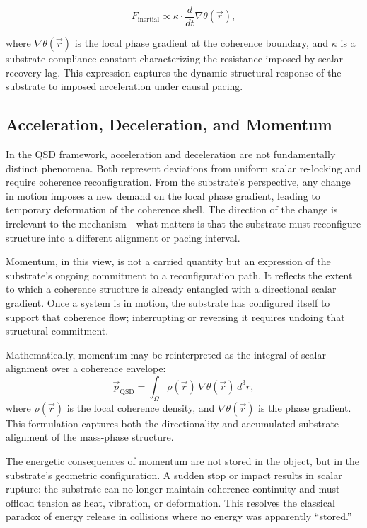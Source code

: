 \documentclass[entropy,article,submit,pdftex,moreauthors]{Definitions/mdpi}
\begin{document}
\begin{equation}
    F_{\text{inertial}} \propto \kappa \cdot \frac{d}{dt} \nabla \theta(\vec{r}),
\end{equation}

where \( \nabla \theta(\vec{r}) \) is the local phase gradient at the coherence boundary, and \( \kappa \) is a substrate compliance constant characterizing the resistance imposed by scalar recovery lag. This expression captures the dynamic structural response of the substrate to imposed acceleration under causal pacing.



\subsection{Acceleration, Deceleration, and Momentum}

In the QSD framework, acceleration and deceleration are not fundamentally distinct phenomena. Both represent deviations from uniform scalar re-locking and require coherence reconfiguration. From the substrate's perspective, any change in motion imposes a new demand on the local phase gradient, leading to temporary deformation of the coherence shell. The direction of the change is irrelevant to the mechanism—what matters is that the substrate must reconfigure structure into a different alignment or pacing interval.

Momentum, in this view, is not a carried quantity but an expression of the substrate’s ongoing commitment to a reconfiguration path. It reflects the extent to which a coherence structure is already entangled with a directional scalar gradient. Once a system is in motion, the substrate has configured itself to support that coherence flow; interrupting or reversing it requires undoing that structural commitment.

Mathematically, momentum may be reinterpreted as the integral of scalar alignment over a coherence envelope:
\[
\vec{p}_{\text{QSD}} = \int_{\Omega} \rho(\vec{r}) \, \nabla \theta(\vec{r}) \, d^3r,
\]
where \( \rho(\vec{r}) \) is the local coherence density, and \( \nabla \theta(\vec{r}) \) is the phase gradient. This formulation captures both the directionality and accumulated substrate alignment of the mass-phase structure.

The energetic consequences of momentum are not stored in the object, but in the substrate’s geometric configuration. A sudden stop or impact results in scalar rupture: the substrate can no longer maintain coherence continuity and must offload tension as heat, vibration, or deformation. This resolves the classical paradox of energy release in collisions where no energy was apparently “stored.”
\end{document}
